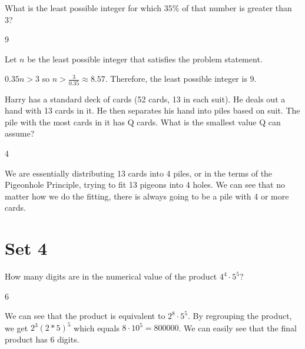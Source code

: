 \documentclass[11pt]{article}
\begin{document}
\begin{problem}
What is the least possible integer for which $35\%$ of that number is greater than 3?
\end{problem}

\begin{answer}
9
\end{answer}

\begin{solution}
Let $n$ be the least possible integer that satisfies the problem statement.

$0.35n > 3$ so $n > \frac{3}{0.35} \approx 8.57$. Therefore, the least possible integer is $9$.
\end{solution}


\begin{problem}
Harry has a standard deck of cards (52 cards, 13 in each suit). He deals out a hand with 13 cards in it. He then separates his hand into piles based on suit. The pile with the most cards in it has Q cards. What is the smallest value Q can assume?
\end{problem}

\begin{answer}
4
\end{answer}

\begin{solution} %
We are essentially distributing 13 cards into 4 piles, or in the terms of the Pigeonhole Principle, trying to fit 13 pigeons into 4 holes. We can see that no matter how we do the fitting, there is always going to be a pile with 4 or more cards. 
\end{solution}

\newpage

\section*{Set 4}

\begin{problem}
How many digits are in the numerical value of the product $4^{4} \cdot 5^{5}$?
\end{problem}

\begin{answer}
6
\end{answer}

\begin{solution}
We can see that the product is equivalent to $2^{8} \cdot 5^{5}$. By regrouping the product, we get $2^3 (2*5)^{5}$ which equals $8 \cdot 10^{5} = 800000$. We can easily see that the final product has 6 digits. 
\end{solution}
\end{document}
